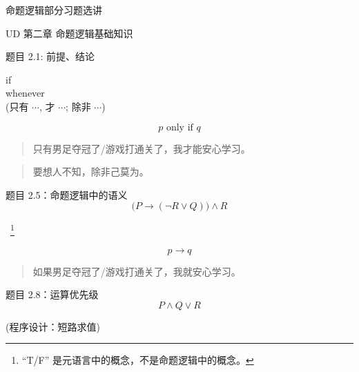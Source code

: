 \begin{frame}{}
  \centerline{\LARGE 命题逻辑部分习题选讲}
  \vspace{0.50cm}
  \centerline{\large UD 第二章 \; 命题逻辑基础知识}
\end{frame}

\begin{frame}{}
  \begin{exampleblock}{题目 2.1: 前提、结论}
    \begin{center}
      if \\[8pt]
      whenever \\[12pt]
       (只有 $\cdots$, 才 $\cdots$; 除非 $\cdots$)
    \end{center}
  \end{exampleblock}

  \[
    p \text{ only if } q
  \]

  \pause
  \vspace{0.80cm}
  \begin{quote}
    \centerline{只有男足夺冠了/游戏打通关了，我才能安心学习。}
  \end{quote}

  \pause
  \begin{quote}
    \centerline{要想人不知，除非己莫为。}
  \end{quote}
\end{frame}

\begin{frame}{}
  \begin{exampleblock}{题目 2.5：命题逻辑中的语义}
    \[
      \big(P \to (\lnot R \lor Q)\big) \land R
    \]

    \vspace{0.40cm}
    \centerline{~\footnote{``T/F'' 是元语言中的概念，不是命题逻辑中的概念。}}
  \end{exampleblock}

  \pause

  \[
    p \to q
  \]

  \begin{quote}
    \centerline{如果男足夺冠了/游戏打通关了，我就安心学习。}
  \end{quote}

  \pause
  \begin{exampleblock}{题目 2.8：运算优先级}
    \[
      P \land Q \lor R
    \]
    \pause
    \centerline{(程序设计：短路求值)}
  \end{exampleblock}
\end{frame}

